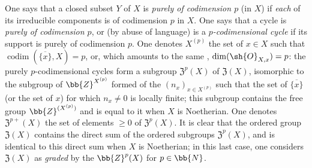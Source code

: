 \begin{env}[21.6.2]
\label{IV.21.6.2}
One says that a closed subset $Y$ of $X$ is \emph{purely of codimension $p$} (in $X$) if \emph{each} of its irreducible components is of codimension $p$ in $X$.
One says that a cycle is \emph{purely of codimension $p$}, or (by abuse of language) is a \emph{$p$-codimensional cycle} if its support is purely of codimension $p$.
One denotes $X^{(p)}$ the set of $x\in X$ such that $\operatorname{codim}(\overline{\{x\}},X)=p$, or, which amounts to the same , $\dim(\sh{O}_{X,x})=p$:
the purely $p$-codimensional cycles form a subgroup $\mathfrak{Z}^p(X)$ of $\mathfrak{Z}(X)$, isomorphic to the subgroup of $\bb{Z}^{X^{(p)}}$ formed of the $(n_x)_{x\in X^{(p)}}$ such that the set of $\overline{\{x\}}$ (or the set of $x$) for which $n_x\neq 0$ is locally finite;
this subgroup contains the free group $\bb{Z}^{(X^{(p)})}$ and is equal to it when $X$ is Noetherian.
One denotes $\mathfrak{Z}^{p+}(X)$ the set of elements $\geq 0$ of $\mathfrak{Z}^p(X)$.
It is clear that the ordered group $\mathfrak{Z}(X)$ contains the direct sum of the ordered subgroups $\mathfrak{Z}^p(X)$, and is identical to this direct sum when $X$ is Noetherian;
in this last case, one considers $\mathfrak{Z}(X)$ as \emph{graded} by the $\bb{Z}^p(X)$ for $p\in\bb{N}$.
\end{env}

